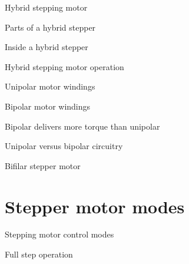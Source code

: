\documentclass[compress]{beamer}
\begin{document}
{
    \begin{frame}{Hybrid stepping motor}
    \end{frame}
}


{
    \begin{frame}{Parts of a hybrid stepper}
    \end{frame}
}

{
    \begin{frame}{Inside a hybrid stepper}
    \end{frame}
}

{
    \begin{frame}{Hybrid stepping motor operation}
    \end{frame}
}

{
    \begin{frame}{Unipolar motor windings}
    \end{frame}
}

{
    \begin{frame}{Bipolar motor windings}
    \end{frame}
}

{
    \begin{frame}{Bipolar delivers more torque than unipolar}
    \end{frame}
}

{
    \begin{frame}{Unipolar versus bipolar circuitry}
    \end{frame}
}

{
    \begin{frame}{Bifilar stepper motor}
    \end{frame}
}

\section{Stepper motor modes}

{
    \begin{frame}{Stepping motor control modes}
    \end{frame}
}
{
    \begin{frame}{Full step operation}
    \end{frame}
}
\end{document}
